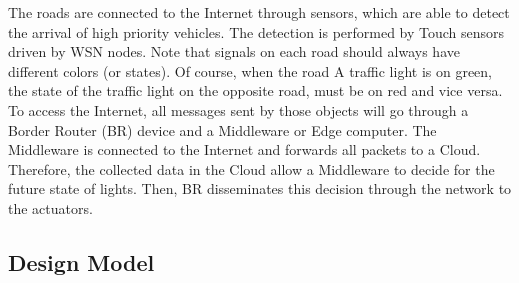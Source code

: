 The roads are connected to the Internet through sensors,
	which are able to detect the arrival of high priority vehicles.
The detection is performed by Touch sensors driven by WSN nodes.
Note that signals on each road should always have different colors (or states).
Of course,
	when the road A traffic light is on green,
	the state of the traffic light on the opposite road,
	must be on red and vice versa.
To access the Internet,
	all messages sent by those objects will go through a Border Router (BR) device and a Middleware or Edge computer.
The Middleware is connected to the Internet and forwards all packets to a Cloud.
Therefore,
	the collected data in the Cloud allow a Middleware to decide for the future state of lights.
Then,
	BR disseminates this decision through the network to the actuators.



%







\subsection{Design Model}

